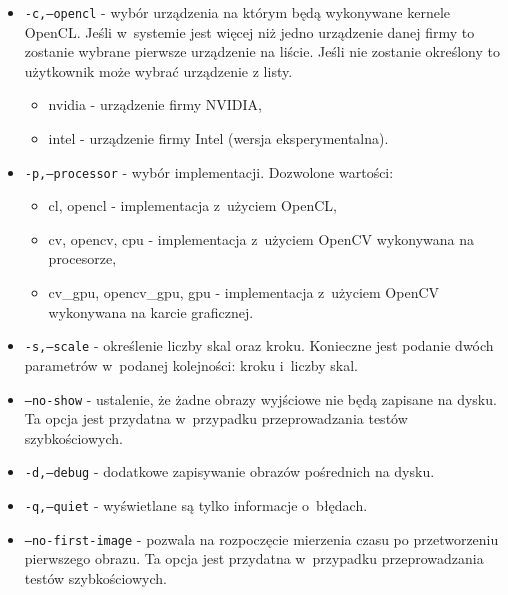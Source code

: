 \begin{itemize}
\item \texttt{-c,--opencl} - wybór urządzenia na którym będą wykonywane kernele OpenCL. Jeśli w~systemie jest więcej niż jedno urządzenie danej firmy to zostanie wybrane pierwsze urządzenie na liście. Jeśli nie zostanie określony to użytkownik może wybrać urządzenie z listy.
	\begin{itemize}
		\item nvidia - urządzenie firmy NVIDIA,
        \item intel - urządzenie firmy Intel (wersja eksperymentalna).
	\end{itemize}
\item \texttt{-p,--processor} - wybór implementacji. Dozwolone wartości:
	\begin{itemize}
		\item cl, opencl - implementacja z~użyciem OpenCL,
        \item cv, opencv, cpu - implementacja z~użyciem OpenCV wykonywana na procesorze,
        \item cv\_gpu, opencv\_gpu, gpu - implementacja z~użyciem OpenCV wykonywana na karcie graficznej.
	\end{itemize}
\item \texttt{-s,--scale} - określenie liczby skal oraz kroku. Konieczne jest podanie dwóch parametrów w~podanej kolejności: kroku i~liczby skal.
\item \texttt{--no-show} - ustalenie, że żadne obrazy wyjściowe nie będą zapisane na dysku. Ta opcja jest przydatna w~przypadku przeprowadzania testów szybkościowych.
\item \texttt{-d,--debug} - dodatkowe zapisywanie obrazów pośrednich na dysku.
\item \texttt{-q,--quiet} - wyświetlane są tylko informacje o~błędach.
\item \texttt{--no-first-image} - pozwala na rozpoczęcie mierzenia czasu po przetworzeniu pierwszego obrazu. Ta opcja jest przydatna w~przypadku przeprowadzania testów szybkościowych.
\end{itemize}